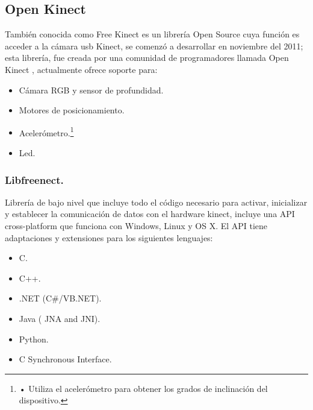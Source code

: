 \documentclass[11pt,a4paper]{article}
\begin{document}
\subsection{Open Kinect}
También conocida como Free Kinect es un librería Open Source cuya función es acceder a la cámara usb Kinect, se comenzó a desarrollar en noviembre del 2011; esta librería, fue creada por una comunidad de programadores llamada Open Kinect \cite{Open Kinect}, actualmente ofrece soporte para:
\begin{itemize}
\item Cámara RGB y sensor de profundidad.
\item Motores de posicionamiento.
\item Acelerómetro.\footnote{• Utiliza el acelerómetro para obtener los grados de inclinación del dispositivo.}
\item Led.
\end{itemize}
\subsubsection{Libfreenect.}
Librería de bajo nivel que incluye todo el código necesario para activar, inicializar y establecer la comunicación de datos con el hardware kinect, incluye una API cross-platform que funciona con Windows, Linux  y OS X. El API tiene adaptaciones y extensiones para los siguientes lenguajes:
\begin{itemize}
\item C.
\item C++.
\item .NET (C\#/VB.NET).
\item Java ( JNA and JNI).
\item Python.
\item C Synchronous Interface.
\end{itemize} 
\end{document}
